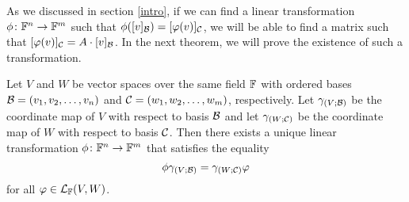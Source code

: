 As we discussed in section \ref{intro}, if we can find a linear transformation
$\phi \colon \mathbb{F}^{n} \to \mathbb{F}^{m}$ such that $\phi([v]_{\mathcal{B}}) =
[\varphi(v)]_{\mathcal{C}}$, we will be able to find a matrix such that
$[\varphi(v)]_{\mathcal{C}} = A \cdot [v]_{\mathcal{B}}$. In the next theorem,
we will prove the existence of such a transformation.

\begin{theorem} \label{thrm2}
    Let $V$ and $W$ be vector spaces over the same field $\mathbb{F}$ with ordered
    bases $\mathcal{B} = (v_{1}, v_{2}, \dots, v_{n})$ and
    $\mathcal{C} = (w_{1}, w_{2}, \dots, w_{m})$, respectively. Let $\gamma_{(V; \mathcal{B})}$
    be the coordinate map of $V$ with respect to basis $\mathcal{B}$ and let
    $\gamma_{(W; \mathcal{C})}$ be the coordinate map of $W$ with respect to basis $\mathcal{C}$.
    Then there exists a unique linear transformation
    $\phi \colon \mathbb{F}^{n} \to \mathbb{F}^{m}$ that satisfies the equality
    \[
        \phi \gamma_{(V; \mathcal{B})} = \gamma_{(W; \mathcal{C})} \varphi
    \]
    for all $\varphi \in \mathcal{L}_{\mathbb{F}}(V, W)$.
\end{theorem}

